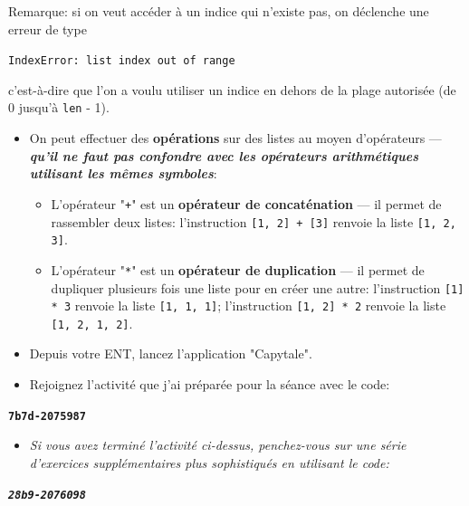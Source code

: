 \documentclass[12pt]{article}
\begin{document}
\begin{itemize}
\begin{itemize}
\begin{itemize}
				\end{itemize}
			\end{itemize}
			Remarque: si on veut accéder à un indice qui n'existe pas, on déclenche une erreur de type
			\begin{center}
				\texttt{IndexError: list index out of range}
			\end{center}
			c'est-à-dire que l'on a voulu utiliser un indice en dehors de la plage autorisée (de 0 jusqu'à \texttt{len} - 1).			
			\begin{itemize}
				\item On peut effectuer des \textbf{opérations} sur des listes au moyen d'opérateurs --- \textbf{\textit{qu'il ne faut pas confondre avec les opérateurs arithmétiques utilisant les mêmes symboles}}:
				\begin{itemize}
					\item L'opérateur "\texttt{+}" est un \textbf{opérateur de concaténation} --- il permet de rassembler deux listes: l'instruction \texttt{[1, 2] + [3]} renvoie la liste \texttt{[1, 2, 3]}.
					\item L'opérateur "\texttt{*}" est un \textbf{opérateur de duplication} --- il permet de dupliquer plusieurs fois une liste pour en créer une autre: l'instruction \texttt{[1] * 3} renvoie la liste \texttt{[1, 1, 1]}; l'instruction \texttt{[1, 2] * 2} renvoie la liste \texttt{[1, 2, 1, 2]}.
				\end{itemize}
			\end{itemize}
	\end{itemize}
	
		\begin{tcolorbox}[colframe=red!75!black, boxrule=2pt]
		\begin{minipage}{1\textwidth}
			\begin{itemize}				
				\item Depuis votre ENT, lancez l'application "Capytale".
				\item Rejoignez l'activité que j'ai préparée pour la séance avec le code:
			\end{itemize}
			\begin{center}
				\textbf{\texttt{7b7d-2075987}}
			\end{center}
			\begin{itemize}
				\item \textit{Si vous avez terminé l'activité ci-dessus, penchez-vous sur une série d'exercices supplémentaires plus sophistiqués en utilisant le code:}
			\end{itemize}
			\begin{center}
				\textit{\textbf{\texttt{28b9-2076098}}}
			\end{center}
			
		\end{minipage}
	\end{tcolorbox}
	
\end{document}
